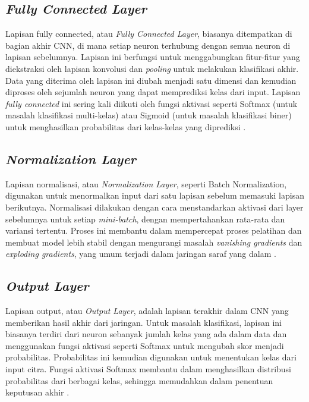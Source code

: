 \subsection{\textit{Fully Connected Layer}}
Lapisan fully connected, atau \textit{Fully Connected Layer}, biasanya ditempatkan di bagian akhir CNN, di mana setiap neuron terhubung dengan semua neuron di lapisan sebelumnya. Lapisan ini berfungsi untuk menggabungkan fitur-fitur yang diekstraksi oleh lapisan konvolusi dan \textit{pooling} untuk melakukan klasifikasi akhir. Data yang diterima oleh lapisan ini diubah menjadi satu dimensi dan kemudian diproses oleh sejumlah neuron yang dapat memprediksi kelas dari input. Lapisan \textit{fully connected} ini sering kali diikuti oleh fungsi aktivasi seperti Softmax (untuk masalah klasifikasi multi-kelas) atau Sigmoid (untuk masalah klasifikasi biner) untuk menghasilkan probabilitas dari kelas-kelas yang diprediksi \cite{Goodfellow-et-al-2016}.

\subsection{\textit{Normalization Layer}}
Lapisan normalisasi, atau \textit{Normalization Layer}, seperti Batch Normalization, digunakan untuk menormalkan input dari satu lapisan sebelum memasuki lapisan berikutnya. Normalisasi dilakukan dengan cara menstandarkan aktivasi dari layer sebelumnya untuk setiap \textit{mini-batch}, dengan mempertahankan rata-rata dan variansi tertentu. Proses ini membantu dalam mempercepat proses pelatihan dan membuat model lebih stabil dengan mengurangi masalah \textit{vanishing gradients} dan\textit{ exploding gradients}, yang umum terjadi dalam jaringan saraf yang dalam \cite{ioffe2015}.

\subsection{\textit{Output Layer}}
Lapisan output, atau \textit{Output Layer}, adalah lapisan terakhir dalam CNN yang memberikan hasil akhir dari jaringan. Untuk masalah klasifikasi, lapisan ini biasanya terdiri dari neuron sebanyak jumlah kelas yang ada dalam data dan menggunakan fungsi aktivasi seperti Softmax untuk mengubah skor menjadi probabilitas. Probabilitas ini kemudian digunakan untuk menentukan kelas dari input citra. Fungsi aktivasi Softmax membantu dalam menghasilkan distribusi probabilitas dari berbagai kelas, sehingga memudahkan dalam penentuan keputusan akhir \cite{Goodfellow-et-al-2016}.

